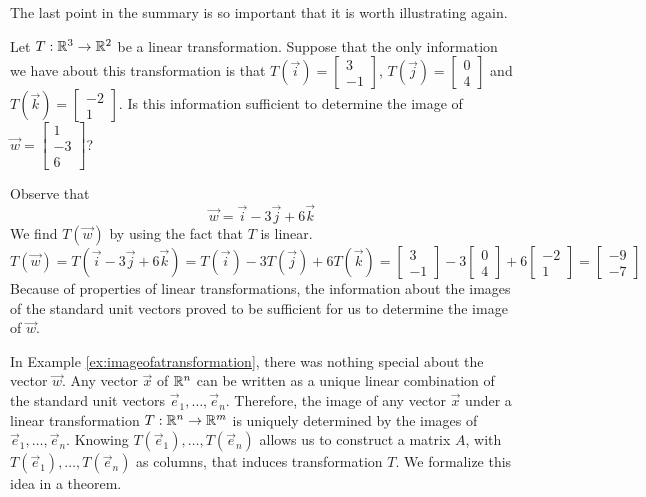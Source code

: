 \documentclass{ximera}
\begin{document}
The last point in the summary is so important that it is worth illustrating again.

\begin{example}\label{ex:imageofatransformation}  
Let $T:\mathbb{R}^3\rightarrow \mathbb{R}^2$ be a linear transformation. Suppose that the only information we have about this transformation is that $T(\vec{i})=\begin{bmatrix}3\\-1\end{bmatrix}$, $T(\vec{j})=\begin{bmatrix}0\\4\end{bmatrix}$ and $T(\vec{k})=\begin{bmatrix}-2\\1\end{bmatrix}$.  Is this information sufficient to determine the image of $\vec{w}=\begin{bmatrix}1\\-3\\6\end{bmatrix}$?

\begin{explanation}  Observe that 
$$\vec{w}=\vec{i}-3\vec{j}+6\vec{k}$$
We find $T(\vec{w})$ by using the fact that $T$ is linear.
$$T(\vec{w})=T(\vec{i}-3\vec{j}+6\vec{k})=T(\vec{i})-3T(\vec{j})+6T(\vec{k})=\begin{bmatrix}3\\-1\end{bmatrix}-3\begin{bmatrix}0\\4\end{bmatrix}+6\begin{bmatrix}-2\\1\end{bmatrix}=\begin{bmatrix}-9\\-7\end{bmatrix}$$
Because of properties of linear transformations, the information about the images of the standard unit vectors proved to be sufficient for us to determine the image of $\vec{w}$. 
\end{explanation}
\end{example}

In Example \ref{ex:imageofatransformation}, there was nothing special about the vector $\vec{w}$.  Any vector $\vec{x}$ of $\mathbb{R}^n$ can be written as a unique linear combination of the standard unit vectors $\vec{e}_1,\ldots , \vec{e}_n$.  Therefore, the image of any vector $\vec{x}$ under a linear transformation $T:\mathbb{R}^n\rightarrow \mathbb{R}^m$ is uniquely determined by the images of $\vec{e}_1, \ldots , \vec{e}_n$.  Knowing $T(\vec{e}_1),\ldots , T(\vec{e}_n)$ allows us to construct a matrix $A$, with $T(\vec{e}_1),\ldots , T(\vec{e}_n)$ as columns, that induces transformation $T$.  We formalize this idea in a theorem.
\end{document}
